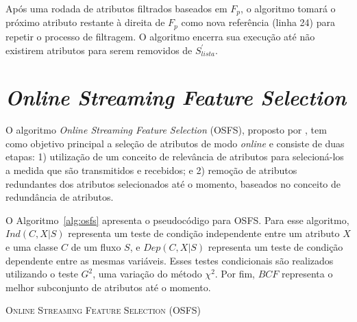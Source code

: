 Após uma rodada de atributos filtrados baseados em $F_p$, o algoritmo tomará o próximo atributo restante à direita de $F_p$ como nova referência (linha 24) para repetir o processo de filtragem. O algoritmo encerra sua execução até não existirem atributos para serem removidos de $S_{lista}^{'}$.

\section{\textit{Online Streaming Feature Selection}}\label{sec:osfs} 

O algoritmo \textit{Online Streaming Feature Selection} (OSFS),
proposto por , tem como objetivo principal a seleção de atributos de modo \textit{online} e consiste de duas etapas: 1) utilização de um conceito de relevância de atributos para selecioná-los a medida que são transmitidos e recebidos; e 2) remoção de atributos redundantes dos atributos selecionados até o momento, baseados no conceito de redundância de atributos. 

O Algoritmo~\ref{alg:osfs} apresenta o pseudocódigo para OSFS. Para esse algoritmo, $Ind(C,X|S)$ representa um teste de condição independente entre um atributo $X$ e uma classe $C$ de um fluxo $S$, e $Dep(C,X|S)$ representa um teste de condição dependente entre as mesmas variáveis. Esses testes condicionais são realizados utilizando o teste $G^{2}$, uma variação do método $\chi^{2}$. Por fim, $BCF$ representa o melhor subconjunto de atributos até o momento.


\begin{algorithm}[!htb]
   \SetAlgoLined
  
   
   \caption{\textsc{Online Streaming Feature Selection (OSFS)}}\label{alg:osfs}
 \end{algorithm}

